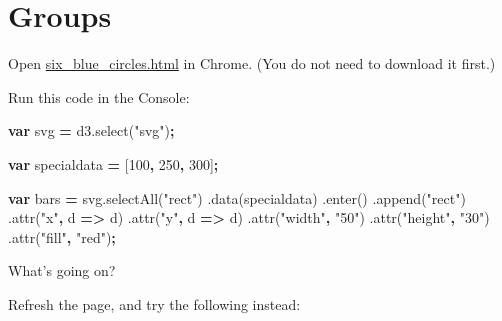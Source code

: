 \documentclass[openany]{book}
\newenvironment{Shaded}{\begin{snugshade}}{\end{snugshade}}
\newcommand{\AttributeTok}[1]{\textcolor[rgb]{0.77,0.63,0.00}{#1}}
\newcommand{\DecValTok}[1]{\textcolor[rgb]{0.00,0.00,0.81}{#1}}
\newcommand{\KeywordTok}[1]{\textcolor[rgb]{0.13,0.29,0.53}{\textbf{#1}}}
\newcommand{\NormalTok}[1]{#1}
\newcommand{\OperatorTok}[1]{\textcolor[rgb]{0.81,0.36,0.00}{\textbf{#1}}}
\newcommand{\StringTok}[1]{\textcolor[rgb]{0.31,0.60,0.02}{#1}}
\newcommand{\VariableTok}[1]{\textcolor[rgb]{0.00,0.00,0.00}{#1}}
\begin{document}
\hypertarget{groups}{%
\section{Groups }\label{groups}}

Open \href{code/six_blue_circles.html}{six\_blue\_circles.html} in Chrome. (You do not need to download it first.)

Run this code in the Console:

\begin{Shaded}
\begin{Highlighting}[]
\KeywordTok{var}\NormalTok{ svg }\OperatorTok{=} \VariableTok{d3}\NormalTok{.}\AttributeTok{select}\NormalTok{(}\StringTok{"svg"}\NormalTok{)}\OperatorTok{;}

\KeywordTok{var}\NormalTok{ specialdata }\OperatorTok{=}\NormalTok{ [}\DecValTok{100}\OperatorTok{,} \DecValTok{250}\OperatorTok{,} \DecValTok{300}\NormalTok{]}\OperatorTok{;}

\KeywordTok{var}\NormalTok{ bars }\OperatorTok{=} \VariableTok{svg}\NormalTok{.}\AttributeTok{selectAll}\NormalTok{(}\StringTok{"rect"}\NormalTok{)}
\NormalTok{      .}\AttributeTok{data}\NormalTok{(specialdata)}
\NormalTok{      .}\AttributeTok{enter}\NormalTok{()}
\NormalTok{      .}\AttributeTok{append}\NormalTok{(}\StringTok{"rect"}\NormalTok{)}
\NormalTok{        .}\AttributeTok{attr}\NormalTok{(}\StringTok{"x"}\OperatorTok{,}\NormalTok{ d }\OperatorTok{=>}\NormalTok{ d)}
\NormalTok{        .}\AttributeTok{attr}\NormalTok{(}\StringTok{"y"}\OperatorTok{,}\NormalTok{ d }\OperatorTok{=>}\NormalTok{ d)}
\NormalTok{        .}\AttributeTok{attr}\NormalTok{(}\StringTok{"width"}\OperatorTok{,} \StringTok{"50"}\NormalTok{)}
\NormalTok{        .}\AttributeTok{attr}\NormalTok{(}\StringTok{"height"}\OperatorTok{,} \StringTok{"30"}\NormalTok{)}
\NormalTok{        .}\AttributeTok{attr}\NormalTok{(}\StringTok{"fill"}\OperatorTok{,} \StringTok{"red"}\NormalTok{)}\OperatorTok{;}
\end{Highlighting}
\end{Shaded}

What's going on?

Refresh the page, and try the following instead:
\end{document}
